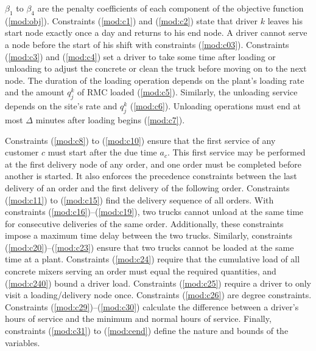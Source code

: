 \documentclass[authoryear,preprint,review,11pt]{elsarticle}
\begin{document}
$\beta_1$ to $\beta_4$ are the penalty coefficients of each component of the objective function (\ref{mod:obj}). Constraints (\ref{mod:c1}) and (\ref{mod:c2}) state that driver $k$ leaves his start node exactly once a day and returns to his end node. A driver cannot serve a node before the start of his shift with constraints (\ref{mod:c03}). Constraints (\ref{mod:c3}) and (\ref{mod:c4}) set a driver to take some time after loading or unloading to adjust the concrete or clean the truck before moving on to the next node. The duration of the loading operation depends on the plant's loading rate and the amount $q^k_j$ of RMC loaded (\ref{mod:c5}). Similarly, the unloading service depends on the site's rate and $q^k_j$ (\ref{mod:c6}). Unloading operations must end at most $\Delta$ minutes after loading begins (\ref{mod:c7}).

Constraints (\ref{mod:c8}) to (\ref{mod:c10}) ensure that the first service of any customer $c$ must start after the due time $a_c$. This first service may be performed at the first delivery node of any order, and one order must be completed before another is started. It also enforces the precedence constraints between the last delivery of an order and the first delivery of the following order. Constraints (\ref{mod:c11}) to (\ref{mod:c15}) find the delivery sequence of all orders. With constraints (\ref{mod:c16})--(\ref{mod:c19}), two trucks cannot unload at the same time for consecutive deliveries of the same order. Additionally, these constraints impose a maximum time delay between the two trucks. Similarly, constraints (\ref{mod:c20})--(\ref{mod:c23}) ensure that two trucks cannot be loaded at the same time at a plant. Constraints (\ref{mod:c24}) require that the cumulative load of all concrete mixers serving an order must equal the required quantities, and (\ref{mod:c240}) bound a driver load. Constraints (\ref{mod:c25}) require a driver to only visit a loading/delivery node once. Constraints (\ref{mod:c26}) are degree constraints. Constraints (\ref{mod:c29})--(\ref{mod:c30}) calculate the difference between a driver's hours of service and the minimum and normal hours of service. Finally, constraints (\ref{mod:c31}) to (\ref{mod:cend}) define the nature and bounds of the variables.
\end{document}
